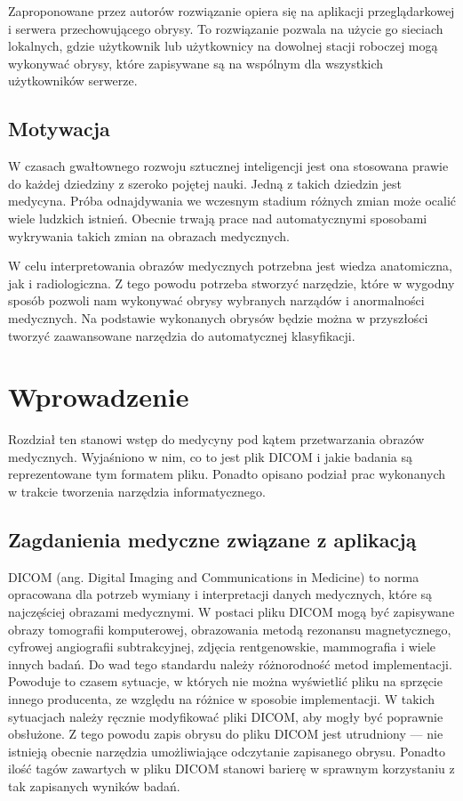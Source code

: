 \documentclass[a4paper,11pt,twoside,openright]{report}
\theoremstyle{definition}
\begin{document}
Zaproponowane przez autorów rozwiązanie opiera się na aplikacji przeglądarkowej
i serwera przechowującego obrysy. To rozwiązanie pozwala na użycie go sieciach
lokalnych, gdzie użytkownik lub użytkownicy na dowolnej stacji roboczej mogą
wykonywać obrysy, które zapisywane są na wspólnym dla wszystkich użytkowników serwerze.

\section*{Motywacja}

W czasach gwałtownego rozwoju sztucznej inteligencji jest ona stosowana prawie
do każdej dziedziny z szeroko pojętej nauki. Jedną z takich dziedzin jest medycyna.
Próba odnajdywania we wczesnym stadium różnych zmian może ocalić
wiele ludzkich istnień. Obecnie trwają prace nad automatycznymi
sposobami wykrywania takich zmian na obrazach medycznych.

W celu interpretowania obrazów medycznych potrzebna jest wiedza anatomiczna, jak
i radiologiczna. Z tego powodu potrzeba stworzyć narzędzie, które w wygodny sposób
pozwoli nam wykonywać obrysy wybranych narządów i anormalności medycznych. Na
podstawie wykonanych obrysów będzie można w przyszłości tworzyć zaawansowane
narzędzia do automatycznej klasyfikacji.

\chapter {Wprowadzenie}

Rozdział ten stanowi wstęp do medycyny pod kątem przetwarzania obrazów medycznych.
Wyjaśniono w nim, co to jest plik DICOM i jakie badania są reprezentowane tym
formatem pliku. Ponadto opisano podział prac wykonanych w trakcie tworzenia
narzędzia informatycznego.

\section {Zagdanienia medyczne związane z aplikacją}

DICOM (ang. Digital Imaging and Communications in Medicine) \cite{DICOM} to norma
opracowana dla potrzeb wymiany i interpretacji danych medycznych, które są
najczęściej obrazami medycznymi. W postaci pliku DICOM mogą być zapisywane obrazy
tomografii komputerowej, obrazowania metodą rezonansu magnetycznego, cyfrowej
angiografii subtrakcyjnej, zdjęcia rentgenowskie, mammografia i wiele innych badań.
Do wad tego standardu należy różnorodność metod implementacji. Powoduje to czasem
sytuacje, w których nie można wyświetlić pliku na sprzęcie innego producenta, ze
względu na różnice w sposobie implementacji. W takich sytuacjach należy ręcznie
modyfikować pliki DICOM, aby mogły być poprawnie obsłużone. Z tego powodu zapis
obrysu do pliku DICOM jest utrudniony --- nie istnieją obecnie narzędzia
umożliwiające odczytanie zapisanego obrysu. Ponadto ilość tagów zawartych w pliku
DICOM stanowi barierę w sprawnym korzystaniu z tak zapisanych wyników badań.
\end{document}
